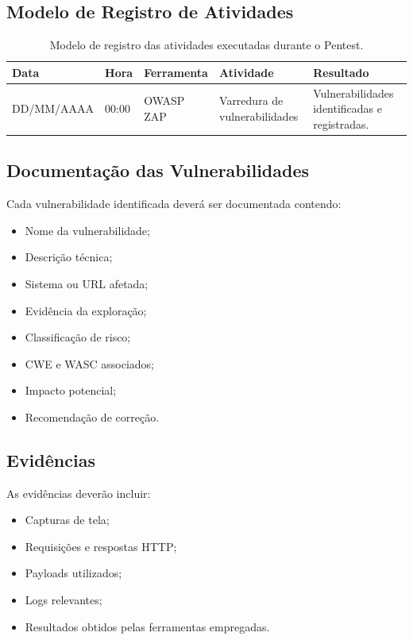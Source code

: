 \subsection{Modelo de Registro de Atividades}

\begin{table}[H]
\centering
\small
\begin{tabularx}{\textwidth}{|p{2.2cm}|p{1.0cm}|p{2.0cm}|p{4.25cm}|X|}
\hline
\textbf{Data} &
\textbf{Hora} &
\textbf{Ferramenta} &
\textbf{Atividade} &
\textbf{Resultado} \\
\hline

DD/MM/AAAA &
00:00 &
OWASP ZAP &
Varredura de vulnerabilidades &
Vulnerabilidades identificadas e registradas. \\
\hline

\end{tabularx}
\caption{Modelo de registro das atividades executadas durante o Pentest.}
\label{tab:registro_atividades}
\end{table}

\subsection{Documentação das Vulnerabilidades}

Cada vulnerabilidade identificada deverá ser documentada contendo:

\begin{itemize}
\item Nome da vulnerabilidade;
\item Descrição técnica;
\item Sistema ou URL afetada;
\item Evidência da exploração;
\item Classificação de risco;
\item CWE e WASC associados;
\item Impacto potencial;
\item Recomendação de correção.
\end{itemize}

\subsection{Evidências}

As evidências deverão incluir:

\begin{itemize}
\item Capturas de tela;
\item Requisições e respostas HTTP;
\item Payloads utilizados;
\item Logs relevantes;
\item Resultados obtidos pelas ferramentas empregadas.
\end{itemize}

